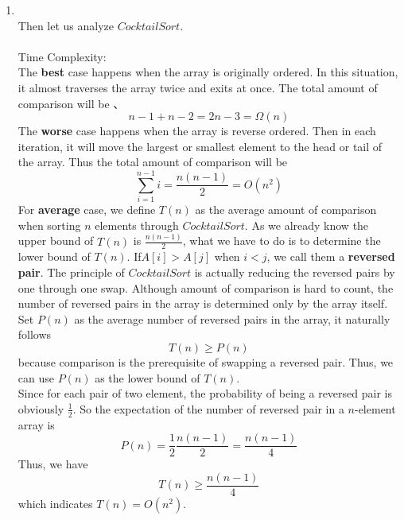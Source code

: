 \documentclass[12pt,a4paper]{article}
\makeatletter
\newtheorem*{solution}{Solution}
\theoremstyle{definition}
\renewenvironment{solution}[1][Solution] {\par\pushQED{\qed}\normalfont\topsep6\p@\@plus6\p@\relax\trivlist\item[\hskip\labelsep\bfseries#1\@addpunct{.}]\ignorespaces}{\popQED\endtrivlist\@endpefalse} \makeatother
\makeatother
\begin{document}
\begin{enumerate}
\begin{solution}
\begin{enumerate}
       ~\\
       Then let us analyze $CocktailSort$.\\
       ~\\
       Time Complexity:\\
       The \textbf{best} case happens when the array is originally ordered. In this situation, it almost traverses the array twice and exits at once. The total amount of comparison will be 、
       \begin{equation}
           n-1+n-2 = 2n-3 = \Omega(n)
       \end{equation}
       The \textbf{worse} case happens when the array is reverse ordered. Then in each iteration, it will move the largest or smallest element to the head or tail of the array. Thus the total amount of comparison will be
       \begin{equation}
           \sum_{i=1}^{n-1}i = \frac{n(n-1)}{2} = O(n^2)
       \end{equation}
       For \textbf{average} case, we define $T(n)$ as the average amount of comparison when sorting $n$ elements through $CocktailSort$. As we already know the upper bound of $T(n)$ is $\frac{n(n-1)}{2}$, what we have to do is to determine the lower bound of $T(n)$. If$A[i]>A[j]$ when $i<j$, we call them a \textbf{reversed pair}. The principle of $CocktailSort$ is actually reducing the reversed pairs by one through one swap. Although amount of comparison is hard to count, the number of reversed pairs in the array is determined only by the array itself. Set $P(n)$ as the average number of reversed pairs in the array, it naturally follows
       \begin{equation}
           T(n)\ge P(n)
       \end{equation}
       because comparison is the prerequisite of swapping a reversed pair.
       Thus, we can use $P(n)$ as the lower bound of $T(n)$.\\
       Since for each pair of two element, the probability of being a reversed pair is obviously $\frac{1}{2}$. So the expectation of the number of reversed pair in a $n$-element array is
       \begin{equation}
           P(n) = \frac{1}{2}\frac{n(n-1)}{2} = \frac{n(n-1)}{4}
       \end{equation}
       Thus, we have 
       \begin{equation}
           T(n) \ge \frac{n(n-1)}{4}
       \end{equation}
       which indicates $T(n) = O(n^2)$.\\

\end{enumerate}
\end{solution}
\end{enumerate}
\end{document}
